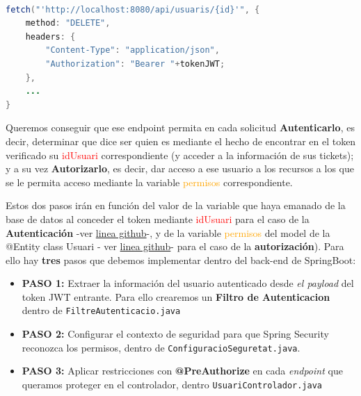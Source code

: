 \documentclass[a4paper,12pt]{report}
\begin{document}
				
\begin{lstlisting}[language=Java, basicstyle=\ttfamily\footnotesize, keywordstyle=\color{magenta}]

fetch("'http://localhost:8080/api/usuaris/{id}'", {
	method: "DELETE",
	headers: {
		"Content-Type": "application/json",
		"Authorization": "Bearer "+tokenJWT;
	},
	...
}
\end{lstlisting}
		
		 Queremos conseguir que ese endpoint permita en cada solicitud \textbf{Autenticarlo}, es decir, determinar que dice ser quien es mediante el hecho de encontrar en el token verificado su \textcolor{red}{idUsuari} correspondiente (y acceder a la información de sus tickets); y a su vez \textbf{Autorizarlo}, es decir, dar acceso a ese usuario a los recursos a los que se le permita acceso mediante la variable \textcolor{orange}{permisos} correspondiente.
		
		 Estos dos pasos irán en función del valor de la variable que haya emanado de la base de datos al conceder el token mediante \textcolor{red}{idUsuari} para el caso de la \textbf{Autenticación} -ver \href{https://github.com/blackcub3s/mercApp/blob/b01cec515bb9af27a1faa24258abb4313ef275cd/APP%20WEB/__springboot__produccio__/app/src/main/java/miApp/app/Usuaris/model/Usuari.java#L30}{linea github}-, y de la variable \textcolor{orange}{permisos} del model de la @Entity class Usuari - ver \href{https://github.com/blackcub3s/mercApp/blob/b01cec515bb9af27a1faa24258abb4313ef275cd/APP%20WEB/__springboot__produccio__/app/src/main/java/miApp/app/Usuaris/model/Usuari.java#L42}{linea github}- para el caso de la \textbf{autorización}). Para ello hay \textbf{tres} pasos que debemos implementar dentro del back-end de SpringBoot:
		
		
		
		
		\begin{itemize} 
			\setlength{\itemsep}{-1.5em}
			\item \textbf{PASO 1:} Extraer la información del usuario autenticado desde \textit{el payload} del token JWT entrante. Para ello crearemos un \textbf{Filtro de Autenticacion} dentro de \texttt{FiltreAutenticacio.java}\\
			\item \textbf{PASO 2:} Configurar el contexto de seguridad para que Spring Security reconozca los permisos, dentro de  \texttt{ConfiguracioSeguretat.java}. \\ 	
			\item \textbf{PASO 3:} Aplicar restricciones con \textbf{@PreAuthorize} en cada \textit{endpoint} que queramos proteger en el controlador, dentro \texttt{UsuariControlador.java}
		\end{itemize}
		
\end{document}
